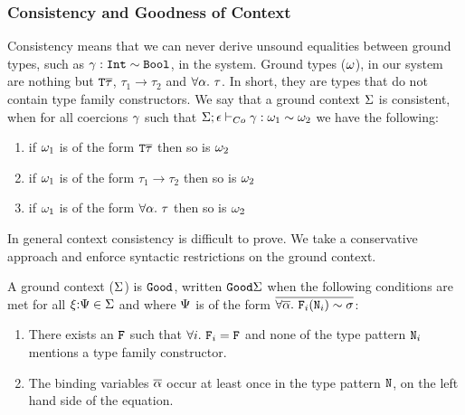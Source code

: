 \documentclass[format=acmsmall,manuscript,review,screen,nonacm,margin=1in,11pt]{acmart}
\begin{document}
\subsubsection{Consistency and Goodness of Context}\label{subsec:tf-closed-consistency}
Consistency means that we can never derive unsound equalities between ground types,
such as $\gamma:\texttt{Int}\mathrel{\sim}\texttt{Bool}$, in the system. Ground types ($\omega$), in our system are
nothing but $\texttt{T}\overline{\tau}$, $\tau_1\to\tau_2$ and $\forall\alpha.~\tau$.
In short, they are types that do not contain type family constructors.
We say that a ground context $\Sigma$ is consistent, when for all coercions $\gamma$
such that $\Sigma;\epsilon \vdash_{Co} \gamma : \omega_1 \mathrel{\sim} \omega_2$ we have the following:
\begin{enumerate}
\item if $\omega_1$ is of the form $\texttt{T}\overline{\tau}$ then so is $\omega_2$
\item if $\omega_1$ is of the form $\tau_1\to\tau_2$ then so is $\omega_2$
\item if $\omega_1$ is of the form $\forall\alpha.~\tau$ then so is $\omega_2$
\end{enumerate}
In general context consistency is difficult to prove. We take a conservative approach
and enforce syntactic restrictions on the ground context.
\begin{property}[$\Good~\GEnv$]
  A ground context ($\Sigma$) is $\texttt{Good}$, written $\texttt{Good}\Sigma$ when
  the following conditions are met for all $\xi{:}\Psi\in\Sigma$ and
  where $\Psi$ is of the form $\overline{\forall\overline{\alpha}.~\texttt{F}_i(\texttt{N}_i)\mathrel{\sim}\sigma}$:
  \begin{enumerate}
  \item There exists an $\texttt{F}$ such that  $\forall i.~\texttt{F}_i = \texttt{F}$ and none of the type pattern $\texttt{N}_i$ mentions a type family constructor.
  \item The binding variables $\overline{\alpha}$ occur at least once in the type pattern $\texttt{N}$,
    on the left hand side of the equation.
  \end{enumerate}
\end{property}
\end{document}
